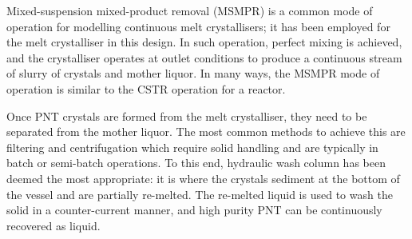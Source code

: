 Mixed-suspension mixed-product removal (MSMPR) is a common mode of operation for modelling continuous melt crystallisers; it has been employed for the melt crystalliser in this design. In such operation, perfect mixing is achieved, and the crystalliser operates at outlet conditions to produce a continuous stream of slurry of crystals and mother liquor. In many ways, the MSMPR mode of operation is similar to the CSTR operation for a reactor. 


Once PNT crystals are formed from the melt crystalliser, they need to be separated from the mother liquor. The most common methods to achieve this are filtering and centrifugation which require solid handling and are typically in batch or semi-batch operations. To this end, hydraulic wash column has been deemed the most appropriate: it is where the crystals sediment at the bottom of the vessel and are partially re-melted. The re-melted liquid is used to wash the solid in a counter-current manner, and high purity PNT can be continuously recovered as liquid.